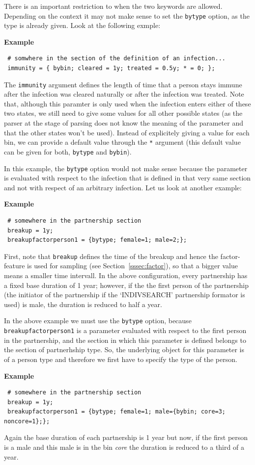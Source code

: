 \documentclass[11pt]{article}
\newenvironment{example}{\par\smallskip\noindent\begingroup\small\textbf{\small Example\enskip}}{\endgroup\par\smallskip}
\begin{document}
There is an important restriction to when the two keywords are allowed.
Depending on the context it may not make sense to set the \texttt{bytype}
option, as the type is already given. Look at the following exmple:
\begin{example}
\begin{verbatim}
 # somwhere in the section of the definition of an infection...
 immunity = { bybin; cleared = 1y; treated = 0.5y; * = 0; };
\end{verbatim}
The \texttt{immunity} argument defines the length of time that a person stays
immune after the infection was cleared naturally or after the infection was
treated. Note that, although this paramter is only used when the infection
enters either of these two states, we still need to give some values for all
other possible states (as the parser at the stage of parsing does not know the
meaning of the parameter and that the other states won't be used). Instead of
explicitely giving a value for each bin, we can provide a default value through
the \texttt{*} argument (this default value can be given for both,
\texttt{bytype} and \texttt{bybin}).
\end{example}

In this example, the \texttt{bytype} option would not make
sense because the parameter is evaluated with respect to the infection that is
defined in that very same section and not with respect of an arbitrary
infection. Let us look at another example:
\begin{example}
\begin{verbatim}
 # somewhere in the partnership section
 breakup = 1y;
 breakupfactorperson1 = {bytype; female=1; male=2;};
\end{verbatim}
First, note that \texttt{breakup} defines the time of the breakup and hence the
factor-feature is used for sampling (see Section~\ref{sssec:factor}), so that a
bigger value means a smaller time intervall. In the above configuration, every
partnership has a fixed base duration of 1 year; however, if the the first
person of the partnership (the initiator of the partnership if the `INDIVSEARCH'
partnership formator is used) is male, the duration is reduced to half a year. 
\end{example}
In the above example we must use the \texttt{bytype} option, because
\texttt{breakupfactorperson1} is a parameter evaluated with respect to the
first person in the partnership, and the section in which this parameter is
defined belongs to the section of partnerhship type. So, the underlying object
for this parameter is of a person type and
therefore we first have to specify the type of the person.
\begin{example}
\begin{verbatim}
 # somewhere in the partnership section
 breakup = 1y;
 breakupfactorperson1 = {bytype; female=1; male={bybin; core=3; noncore=1};};
\end{verbatim}
Again the base duration of each partnership is 1 year but now, if the first
person is a male and this male is in the bin \emph{core} the duration is
reduced to a third of a year. 
\end{example}
\end{document}
